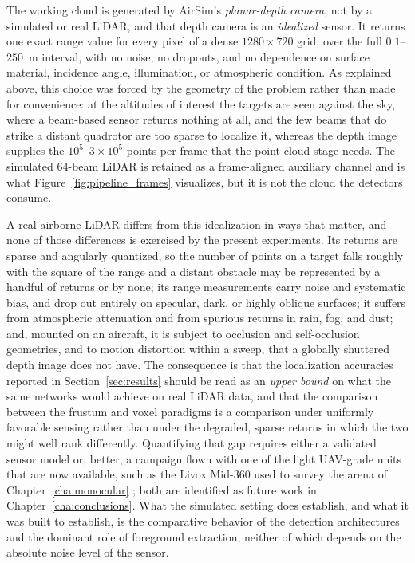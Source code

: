 The working cloud is generated by AirSim's \emph{planar-depth camera}, not by a
simulated or real LiDAR, and that depth camera is an \emph{idealized} sensor.
It returns one exact range value for every pixel of a dense $1280\times720$
grid, over the full $0.1$--$250$~m interval, with no noise, no dropouts, and no
dependence on surface material, incidence angle, illumination, or atmospheric
condition. As explained above, this choice was forced by the geometry of the
problem rather than made for convenience: at the altitudes of interest the targets
are seen against the sky, where a beam-based sensor returns nothing at all, and
the few beams that do strike a distant quadrotor are too sparse to localize it,
whereas the depth image supplies the $10^{5}$--$3\times10^{5}$ points per frame
that the point-cloud stage needs. The simulated $64$-beam LiDAR is retained as a
frame-aligned auxiliary channel and is what
Figure~\ref{fig:pipeline_frames} visualizes, but it is not the cloud the detectors
consume.

A real airborne LiDAR differs from this idealization in ways that matter, and none
of those differences is exercised by the present experiments. Its returns are
sparse and angularly quantized, so the number of points on a target falls roughly
with the square of the range and a distant obstacle may be represented by a
handful of returns or by none; its range measurements carry noise and systematic
bias, and drop out entirely on specular, dark, or highly oblique surfaces; it
suffers from atmospheric attenuation and from spurious returns in rain, fog, and
dust; and, mounted on an aircraft, it is subject to occlusion and self-occlusion
geometries, and to motion distortion within a sweep, that a globally shuttered
depth image does not have. The consequence is that the localization accuracies
reported in Section~\ref{sec:results} should be read as an \emph{upper bound} on
what the same networks would achieve on real LiDAR data, and that the comparison
between the frustum and voxel paradigms is a comparison under uniformly favorable
sensing rather than under the degraded, sparse returns in which the two might
well rank differently. Quantifying that gap requires either a validated sensor
model or, better, a campaign flown with one of the light UAV-grade units that are
now available, such as the Livox Mid-360 used to survey the arena of
Chapter~\ref{cha:monocular} \cite{livox_mid360}; both are identified as future
work in Chapter~\ref{cha:conclusions}. What the simulated setting does establish,
and what it was built to establish, is the comparative behavior of the detection
architectures and the dominant role of foreground extraction, neither of which
depends on the absolute noise level of the sensor.

